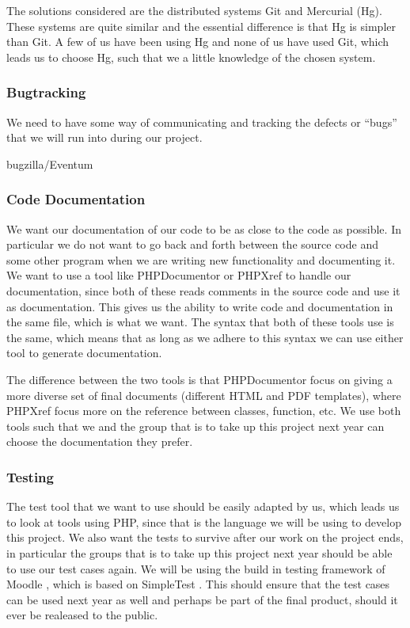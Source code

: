 The solutions considered are the distributed systems Git and Mercurial (Hg).
These systems are quite similar and the essential difference is that Hg is simpler than Git.
A few of us have been using Hg and none of us have used Git, which leads us to choose Hg, such that we a little knowledge of the chosen system.

\subsubsection{Bugtracking}
We need to have some way of communicating and tracking the defects or ``bugs'' that we will run into during our project.

bugzilla/Eventum


\subsubsection{Code Documentation}
We want our documentation of our code to be as close to the code as possible.
In particular we do not want to go back and forth between the source code and some other program when we are writing new functionality and documenting it.
We want to use a tool like PHPDocumentor \cite{phpdocumentor} or PHPXref \cite{phpxref} to handle our documentation, since both of these reads comments in the source code and use it as documentation.
This gives us the ability to write code and documentation in the same file, which is what we want.
The syntax that both of these tools use is the same, which means that as long as we adhere to this syntax we can use either tool to generate documentation.

The difference between the two tools is that PHPDocumentor focus on giving a more diverse set of final documents (different HTML and PDF templates), where PHPXref focus more on the reference between classes, function, etc.
We use both tools such that we and the group that is to take up this project next year can choose the documentation they prefer.


\subsubsection{Testing}
The test tool that we want to use should be easily adapted by us, which leads us to look at tools using PHP, since that is the language we will be using to develop this project.
We also want the tests to survive after our work on the project ends, in particular the groups that is to take up this project next year should be able to use our test cases again.
We will be using the build in testing framework of Moodle \cite{moodletest}, which is based on SimpleTest \cite{simpletest}.
This should ensure that the test cases can be used next year as well and perhaps be part of the final product, should it ever be realeased to the public.










